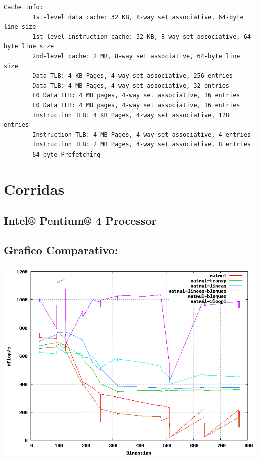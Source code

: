 \documentclass[a4paper,10pt]{article}
\begin{document}
\begin{verbatim}
Cache Info:
        1st-level data cache: 32 KB, 8-way set associative, 64-byte line size
        1st-level instruction cache: 32 KB, 8-way set associative, 64-byte line size
        2nd-level cache: 2 MB, 8-way set associative, 64-byte line size
        Data TLB: 4 KB Pages, 4-way set associative, 256 entries
        Data TLB: 4 MB Pages, 4-way set associative, 32 entries
        L0 Data TLB: 4 MB pages, 4-way set associative, 16 entries
        L0 Data TLB: 4 MB pages, 4-way set associative, 16 entries
        Instruction TLB: 4 KB Pages, 4-way set associative, 128 entries
        Instruction TLB: 4 MB Pages, 4-way set associative, 4 entries
        Instruction TLB: 2 MB Pages, 4-way set associative, 8 entries
        64-byte Prefetching
\end{verbatim}

\clearpage
\section{Corridas}

\subsection{Intel® Pentium® 4 Processor}


\clearpage

\clearpage

\clearpage

\clearpage

\clearpage

\subsection{Grafico Comparativo: }
\includegraphics[width=15cm, bb=0 0 640 480]{./pentium4-plot.png}
\clearpage
\end{document}
